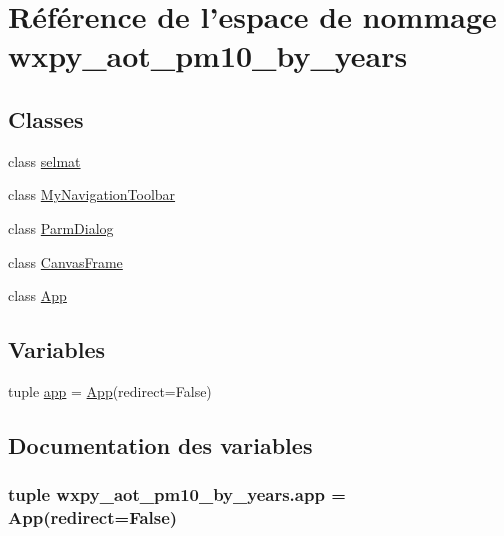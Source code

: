 \hypertarget{namespacewxpy__aot__pm10__by__years}{\section{Référence de l'espace de nommage wxpy\-\_\-aot\-\_\-pm10\-\_\-by\-\_\-years}
\label{namespacewxpy__aot__pm10__by__years}
}
\subsection*{Classes}
\begin{DoxyCompactItemize}
\item 
class \hyperlink{classwxpy__aot__pm10__by__years_1_1selmat}{selmat}
\item 
class \hyperlink{classwxpy__aot__pm10__by__years_1_1_my_navigation_toolbar}{My\-Navigation\-Toolbar}
\item 
class \hyperlink{classwxpy__aot__pm10__by__years_1_1_parm_dialog}{Parm\-Dialog}
\item 
class \hyperlink{classwxpy__aot__pm10__by__years_1_1_canvas_frame}{Canvas\-Frame}
\item 
class \hyperlink{classwxpy__aot__pm10__by__years_1_1_app}{App}
\end{DoxyCompactItemize}
\subsection*{Variables}
\begin{DoxyCompactItemize}
\item 
tuple \hyperlink{namespacewxpy__aot__pm10__by__years_ae73f95ecf03aafc7416828159ebbc5db}{app} = \hyperlink{classwxpy__aot__pm10__by__years_1_1_app}{App}(redirect=False)
\end{DoxyCompactItemize}


\subsection{Documentation des variables}
\hypertarget{namespacewxpy__aot__pm10__by__years_ae73f95ecf03aafc7416828159ebbc5db}{
\subsubsection[{app}]{\setlength{\rightskip}{0pt plus 5cm}tuple wxpy\-\_\-aot\-\_\-pm10\-\_\-by\-\_\-years.\-app = {\bf App}(redirect=False)}}\label{namespacewxpy__aot__pm10__by__years_ae73f95ecf03aafc7416828159ebbc5db}
